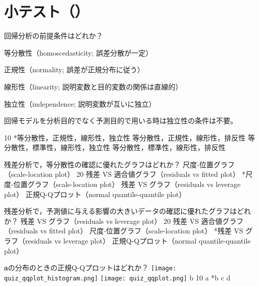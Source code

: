 \newcommand{\Release}{}
\newcommand{\Slide}{}
\newcommand{\PrintLecture}{1}
\newcommand{\PrintSolution}{0}







\maketitle

\section{小テスト（\MyClass）}

\begin{quiz}{\MyClass}

\QuizMultipleChoices
{
  回帰分析の前提条件はどれか？
}
{
  \MyEnums
  {
    \item 等分散性（homoscedasticity; 誤差分散が一定）
    \item 正規性（normality; 誤差が正規分布に従う）
    \item 線形性（linearity; 説明変数と目的変数の関係は直線的）
    \item 独立性（independence; 説明変数が互いに独立）
  }
  回帰モデルを分析目的でなく予測目的で用いる時は独立性の条件は不要。
}
{10}
{*等分散性，正規性，線形性，独立性}
{ 等分散性，正規性，線形性，排反性}
{ 等分散性，標準性，線形性，独立性}
{ 等分散性，標準性，線形性，排反性}

\QuizMultipleChoices
{
   残差分析で，等分散性の確認に優れたグラフはどれか？
}
{
  尺度-位置グラフ（scale-location plot）
}
{20}
{ 残差 VS 適合値グラフ（residuals vs fitted plot）}
{*尺度-位置グラフ（scale-location plot）}
{ 残差 VS グラフ（residuals vs leverage plot）}
{ 正規Q-Qプロット（normal quantile-quantile plot）}

\QuizMultipleChoices
{
   残差分析で，予測値に与える影響の大きいデータの確認に優れたグラフはどれか？
}
{
  残差 VS グラフ（residuals vs leverage plot）
}
{20}
{ 残差 VS 適合値グラフ（residuals vs fitted plot）}
{ 尺度-位置グラフ（scale-location plot）}
{*残差 VS グラフ（residuals vs leverage plot）}
{ 正規Q-Qプロット（normal quantile-quantile plot）}

\QuizMultipleChoices
{
  \textbf{a}の分布のときの正規Q-Qプロットはどれか？
  \texttt{[image: quiz\_qqplot\_histogram.png]}
  \texttt{[image: quiz\_qqplot.png]}
}
{
  b
}
{10}
{ a}
{*b}
{ c}
{ d}


\end{quiz}
